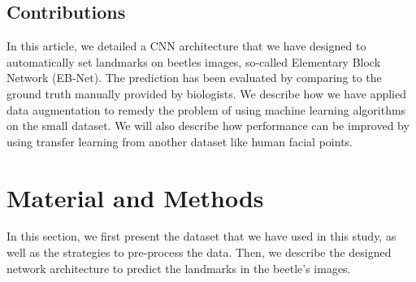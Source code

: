 \documentclass[review]{elsarticle}
\begin{document}
\subsection{Contributions}
In this article, we detailed a CNN architecture that we have designed to automatically set landmarks on beetles images, so-called Elementary Block Network (EB-Net). The prediction has been evaluated by comparing to the ground truth manually provided by biologists. We describe how we have applied data augmentation to remedy the problem of using machine learning algorithms on the small dataset. We will also describe how performance can be improved by using transfer learning from another dataset like human facial points.

\section{Material and Methods}
\label{sec2}
In this section, we first present the dataset that we have used in this study, as well as the strategies to pre-process the data. Then, we describe the designed network architecture to predict the landmarks in the beetle's images.
\end{document}
